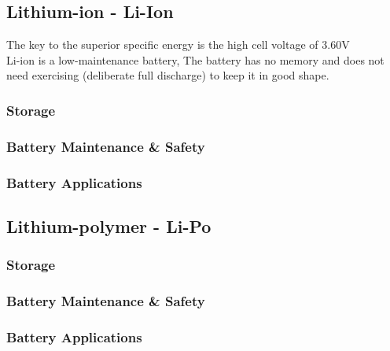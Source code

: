 \documentclass[a4paper,11pt, twocolumn]{article}
\begin{document}
\subsection{Lithium-ion - Li-Ion}

The key to the superior specific energy is the high cell voltage of 3.60V\\
Li-ion is a low-maintenance battery, The battery has no memory and does not need exercising (deliberate full discharge) to keep it in good shape.

\subsubsection{Storage}

\subsubsection{Battery Maintenance \& Safety}

\subsubsection{Battery Applications}


\subsection{Lithium-polymer - Li-Po}

\subsubsection{Storage}

\subsubsection{Battery Maintenance \& Safety}

\subsubsection{Battery Applications}


\newpage
\onecolumn


\end{document}
